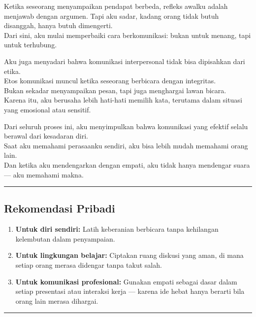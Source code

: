 \documentclass[
  letterpaper,
  DIV=11,
  numbers=noendperiod]{scrreprt}
\providecommand{\tightlist}{%
  \setlength{\itemsep}{0pt}\setlength{\parskip}{0pt}}
\begin{document}
Ketika seseorang menyampaikan pendapat berbeda, refleks awalku adalah
menjawab dengan argumen. Tapi aku sadar, kadang orang tidak butuh
disanggah, hanya butuh dimengerti.\\
Dari sini, aku mulai memperbaiki cara berkomunikasi: bukan untuk menang,
tapi untuk terhubung.

Aku juga menyadari bahwa komunikasi interpersonal tidak bisa dipisahkan
dari etika.\\
Etos komunikasi muncul ketika seseorang berbicara dengan integritas.\\
Bukan sekadar menyampaikan pesan, tapi juga menghargai lawan bicara.\\
Karena itu, aku berusaha lebih hati-hati memilih kata, terutama dalam
situasi yang emosional atau sensitif.

Dari seluruh proses ini, aku menyimpulkan bahwa komunikasi yang efektif
selalu berawal dari kesadaran diri.\\
Saat aku memahami perasaanku sendiri, aku bisa lebih mudah memahami
orang lain.\\
Dan ketika aku mendengarkan dengan empati, aku tidak hanya mendengar
suara --- aku memahami makna.

\begin{center}\rule{0.5\linewidth}{0.5pt}\end{center}

\subsection{Rekomendasi Pribadi}\label{rekomendasi-pribadi}

\begin{enumerate}
\def\labelenumi{\arabic{enumi}.}
\tightlist
\item
  \textbf{Untuk diri sendiri:} Latih keberanian berbicara tanpa
  kehilangan kelembutan dalam penyampaian.\\
\item
  \textbf{Untuk lingkungan belajar:} Ciptakan ruang diskusi yang aman,
  di mana setiap orang merasa didengar tanpa takut salah.\\
\item
  \textbf{Untuk komunikasi profesional:} Gunakan empati sebagai dasar
  dalam setiap presentasi atau interaksi kerja --- karena ide hebat
  hanya berarti bila orang lain merasa dihargai.
\end{enumerate}

\begin{center}\rule{0.5\linewidth}{0.5pt}\end{center}
\end{document}
